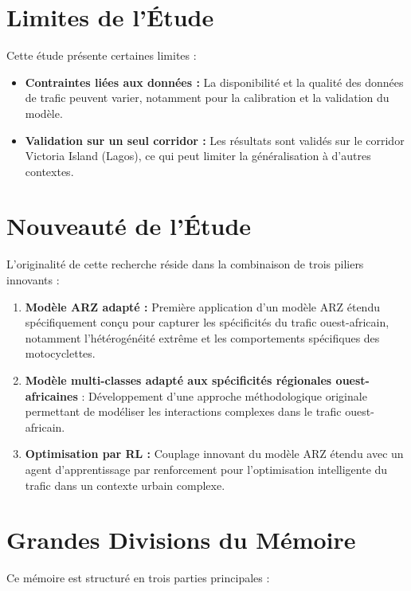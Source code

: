 \section{Limites de l'Étude}
\label{sec:limites_etude}

Cette étude présente certaines limites :
\begin{itemize}
    \item \textbf{Contraintes liées aux données :} La disponibilité et la qualité des données de trafic peuvent varier, notamment pour la calibration et la validation du modèle.
    \item \textbf{Validation sur un seul corridor :} Les résultats sont validés sur le corridor Victoria Island (Lagos), ce qui peut limiter la généralisation à d'autres contextes.

\end{itemize}

\section{Nouveauté de l'Étude}
\label{sec:nouveaute_etude}

L'originalité de cette recherche réside dans la combinaison de trois piliers innovants :
\begin{enumerate}
    \item \textbf{Modèle ARZ adapté :} Première application d'un modèle ARZ étendu spécifiquement conçu pour capturer les spécificités du trafic ouest-africain, notamment l'hétérogénéité extrême et les comportements spécifiques des motocyclettes.
    \item \textbf{Modèle multi-classes adapté aux spécificités régionales ouest-africaines} : Développement d'une approche méthodologique originale permettant de modéliser les interactions complexes dans le trafic ouest-africain.
    \item \textbf{Optimisation par RL :} Couplage innovant du modèle ARZ étendu avec un agent d'apprentissage par renforcement pour l'optimisation intelligente du trafic dans un contexte urbain complexe.
\end{enumerate}

\section{Grandes Divisions du Mémoire}
\label{sec:divisions_memoire}

Ce mémoire est structuré en trois parties principales :

